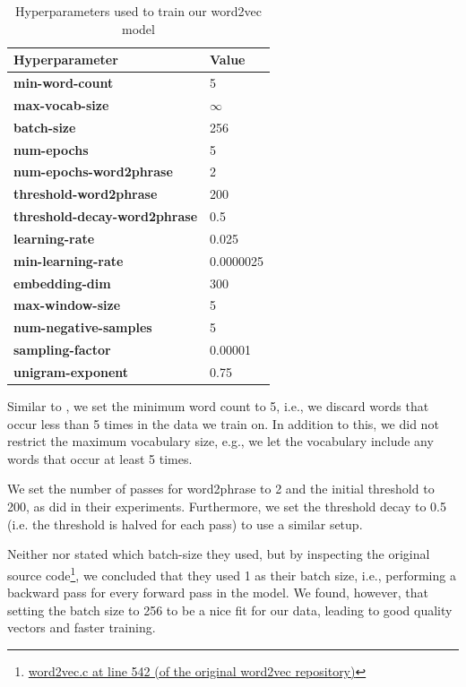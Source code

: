 \begin{table}[ht]
    \centering
    \begin{tabular}{@{}ll@{}}
    \toprule
    Hyperparameter & Value\\
    \midrule
    \rowcolor[HTML]{F5F5F5} \textbf{min-word-count} & 5\\
    \textbf{max-vocab-size} & $\infty$ \\
    \rowcolor[HTML]{F5F5F5} \textbf{batch-size} & 256\\
    \textbf{num-epochs} & 5\\
    \rowcolor[HTML]{F5F5F5} \textbf{num-epochs-word2phrase} & 2\\
    \textbf{threshold-word2phrase} & 200\\
    \rowcolor[HTML]{F5F5F5} \textbf{threshold-decay-word2phrase} & 0.5\\
    \textbf{learning-rate} & 0.025\\
    \rowcolor[HTML]{F5F5F5} \textbf{min-learning-rate} & 0.0000025\\
    \textbf{embedding-dim} & 300\\
    \rowcolor[HTML]{F5F5F5} \textbf{max-window-size} & 5\\
    \textbf{num-negative-samples} & 5\\
    \rowcolor[HTML]{F5F5F5} \textbf{sampling-factor} & 0.00001\\
    \textbf{unigram-exponent} & 0.75\\
    \bottomrule
    \end{tabular}
    \caption{Hyperparameters used to train our word2vec model}
    \label{table:word2vec-hyperparameter-choices}
\end{table}

Similar to \cite{mikolov2013b}, we set the minimum word count to 5, i.e., we discard words that occur less than 5 times in the data we train on. In addition to this, we did not restrict the maximum vocabulary size, e.g., we let the vocabulary include any words that occur at least 5 times.

We set the number of passes for word2phrase to 2 and the initial threshold to 200, as \cite{mikolov2013b} did in their experiments. Furthermore, we set the threshold decay to 0.5 (i.e. the threshold is halved for each pass) to use a similar setup.

Neither \cite{mikolov2013a} nor \cite{mikolov2013b} stated which batch-size they used, but by inspecting the original source code\footnote{\href{https://github.com/tmikolov/word2vec/blob/e092540633572b883e25b367938b0cca2cf3c0e7/word2vec.c/\#L542}{word2vec.c at line 542 (of the original word2vec repository)}}, we concluded that they used 1 as their batch size, i.e., performing a backward pass for every forward pass in the model. We found, however, that setting the batch size to 256 to be a nice fit for our data, leading to good quality vectors and faster training.

